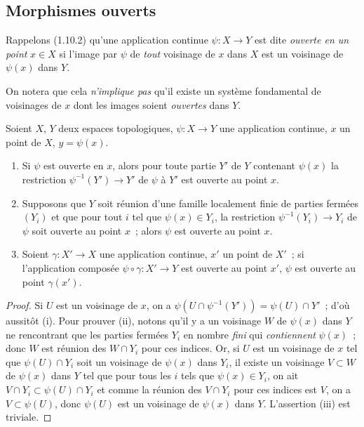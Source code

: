 \subsection{Morphismes ouverts}
\label{subsection:IV.14.1-fr}

\begin{env}[14.1.1]
\label{IV.14.1.1-fr}
Rappelons (1.10.2) qu'une application continue $\psi:X\to Y$ est dite
\emph{ouverte en un point} $x\in X$ si l'image par $\psi$ de \emph{tout} voisinage
de $x$ dans $X$ est un voisinage de $\psi(x)$ dans $Y$.

On notera que cela \emph{n'implique pas} qu'il existe un système fondamental de
voisinages de $x$ dont les images soient \emph{ouvertes} dans $Y$.
\end{env}

\begin{proposition}[14.1.2]
\label{IV.14.1.2-fr}
Soient $X$, $Y$ deux espaces topologiques, $\psi:X\to Y$ une application
continue, $x$ un point de $X$, $y=\psi(x)$.
\begin{enumerate}[label=(\roman*)]
  \item Si $\psi$ est ouverte en $x$, alors pour toute partie $Y'$ de $Y$ contenant
  $\psi(x)$ la restriction $\psi^{-1}(Y')\to Y'$ de $\psi$ à $Y'$ est ouverte au
  point $x$.
  \item Supposons que $Y$ soit réunion d'une famille localement finie de parties
  fermées $(Y_i)$ et que pour tout $i$ tel que $\psi(x)\in Y_i$, la restriction
  $\psi^{-1}(Y_i)\to Y_i$ de $\psi$ soit ouverte au point $x$~; alors $\psi$ est
  ouverte au point $x$.
  \item Soient $\gamma:X'\to X$ une application continue, $x'$ un point de $X'$~;
  si l'application composée $\psi\circ\gamma:X'\to Y$ est ouverte au point $x'$,
  $\psi$ est ouverte au point $\gamma(x')$.
\end{enumerate}
\end{proposition}

\begin{proof}
Si $U$ est un voisinage de $x$, on a
$\psi(U\cap\psi^{-1}(Y'))=\psi(U)\cap Y'$~; d'où aussitôt (i). Pour prouver (ii),
notons qu'il y a un voisinage $W$ de $\psi(x)$ dans $Y$ ne rencontrant que les
parties fermées $Y_i$ en nombre \emph{fini} qui \emph{contiennent} $\psi(x)$~; donc
$W$ est réunion des $W\cap Y_i$ pour ces indices. Or, si $U$ est un voisinage de
$x$ tel que $\psi(U)\cap Y_i$ soit un voisinage de $\psi(x)$ dans $Y_i$, il existe
un voisinage $V\subset W$ de $\psi(x)$ dans $Y$ tel que pour tous les $i$ tels que
$\psi(x)\in Y_i$,
on ait $V\cap Y_i\subset\psi(U)\cap Y_i$ et comme la réunion des $V\cap Y_i$ pour
ces indices est $V$, on a $V\subset\psi(U)$, donc $\psi(U)$ est un voisinage de
$\psi(x)$ dans $Y$. L'assertion (iii) est triviale.
\end{proof}

